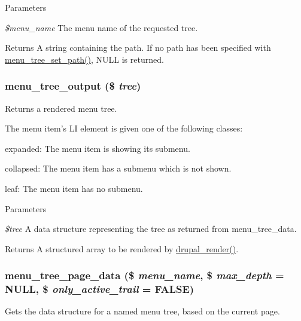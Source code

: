 \begin{DoxyParams}{Parameters}
\item[{\em \$menu\_\-name}]The menu name of the requested tree.\end{DoxyParams}
\begin{DoxyReturn}{Returns}
A string containing the path. If no path has been specified with \hyperlink{group__menu_gacbb655f92275e3c823637edbd9441cdd}{menu\_\-tree\_\-set\_\-path()}, NULL is returned. 
\end{DoxyReturn}
\hypertarget{group__menu_ga2ef0691992a9df71eb3455ba774053e7}{
\subsubsection[{menu\_\-tree\_\-output}]{\setlength{\rightskip}{0pt plus 5cm}menu\_\-tree\_\-output (\$ {\em tree})}}
\label{group__menu_ga2ef0691992a9df71eb3455ba774053e7}
Returns a rendered menu tree.

The menu item's LI element is given one of the following classes:
\begin{DoxyItemize}
\item expanded: The menu item is showing its submenu.
\item collapsed: The menu item has a submenu which is not shown.
\item leaf: The menu item has no submenu.
\end{DoxyItemize}


\begin{DoxyParams}{Parameters}
\item[{\em \$tree}]A data structure representing the tree as returned from menu\_\-tree\_\-data.\end{DoxyParams}
\begin{DoxyReturn}{Returns}
A structured array to be rendered by \hyperlink{common_8inc_a05798b44e8d6c496d4bee5cc32fa7851}{drupal\_\-render()}. 
\end{DoxyReturn}
\hypertarget{group__menu_ga58b0372b3340be5d070d4ca8bf5a7af8}{
\subsubsection[{menu\_\-tree\_\-page\_\-data}]{\setlength{\rightskip}{0pt plus 5cm}menu\_\-tree\_\-page\_\-data (\$ {\em menu\_\-name}, \/  \$ {\em max\_\-depth} = {\ttfamily NULL}, \/  \$ {\em only\_\-active\_\-trail} = {\ttfamily FALSE})}}
\label{group__menu_ga58b0372b3340be5d070d4ca8bf5a7af8}
Gets the data structure for a named menu tree, based on the current page.

